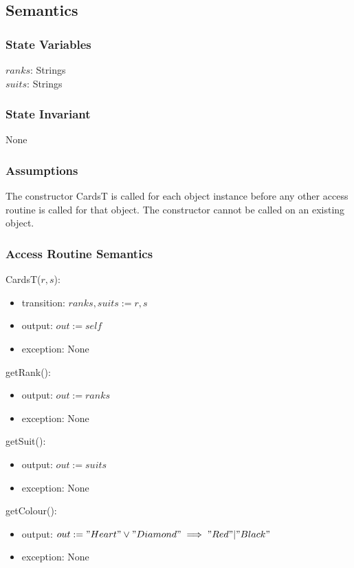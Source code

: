 \documentclass[12pt]{article}
\begin{document}
\subsection* {Semantics}

\subsubsection* {State Variables}

$ranks$: Strings\\
$suits$: Strings

\subsubsection* {State Invariant}

None

\subsubsection* {Assumptions}

The constructor CardsT is called for each object instance before any other
access routine is called for that object.  The constructor cannot be called on
an existing object.

\subsubsection* {Access Routine Semantics}

CardsT($r, s$):
\begin{itemize}
\item transition: $ranks, suits := r, s$
\item output: $out := \mathit{self}$
\item exception: None
\end{itemize}

\noindent getRank():
\begin{itemize}
\item output: $out := ranks$
\item exception: None
\end{itemize}

\noindent getSuit():
\begin{itemize}
\item output: $out := suits$
\item exception: None
\end{itemize}

\noindent getColour():
\begin{itemize}
	\item output: $out := "Heart" \lor "Diamond" \implies "Red" | "Black"$
	\item exception: None
\end{itemize}
\end{document}
